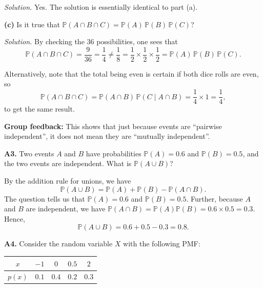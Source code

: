\documentclass[
  a4paper,
]{book}
\theoremstyle{definition}
\theoremstyle{definition}
\theoremstyle{definition}
\theoremstyle{definition}
\theoremstyle{remark}
\begin{document}
\begin{myanswers}
\emph{Solution.} Yes. The solution is essentially identical to part (a).

\end{myanswers}

\textbf{(c)} Is it true that \(\mathbb P(A \cap B \cap C) = \mathbb P(A) \, \mathbb P(B) \, \mathbb P(C)\)?

\begin{myanswers}
\emph{Solution.}
By checking the 36 possibilities, one sees that
\[ \mathbb P(A \cap B \cap C) = \frac{9}{36} = \frac{1}{4} \neq \frac{1}{8} = \frac12 \times \frac12 \times \frac12 = \mathbb P(A)\, \mathbb P(B) \, \mathbb P(C) . \]

Alternatively, note that the total being even is certain if both dice rolls are even, so
\[ \mathbb P(A \cap B \cap C) = \mathbb P(A \cap B) \, \mathbb P(C \mid A \cap B) = \frac14 \times 1 = \frac14 , \]
to get the same result.

\textbf{Group feedback:} This shows that just because events are ``pairwise independent'', it does not mean they are ``mutually independent''.

\end{myanswers}

\textbf{A3.} Two events \(A\) and \(B\) have probabilities \(\mathbb P(A) = 0.6\) and \(\mathbb P(B) = 0.5\), and the two events are independent. What is \(\mathbb P(A \cup B)\)?

\begin{myanswers}
By the addition rule for unions, we have
\[ \mathbb P(A \cup B) = \mathbb P(A) + \mathbb P(B) - \mathbb P(A \cap B) . \]
The question tells us that \(\mathbb P(A) = 0.6\) and \(\mathbb P(B) = 0.5\). Further, because \(A\) and \(B\) are independent, we have \(\mathbb P(A \cap B) = \mathbb P(A)\mathbb P(B) = 0.6 \times 0.5 = 0.3\). Hence,
\[ \mathbb P(A \cup B) = 0.6 + 0.5 - 0.3 = 0.8 . \]

\end{myanswers}

\textbf{A4.} Consider the random variable \(X\) with the following PMF:

\begin{longtable}[]{@{}ccccc@{}}
\toprule\noalign{}
\(x\) & \(-1\) & \(0\) & \(0.5\) & \(2\) \\
\midrule\noalign{}
\endhead
\bottomrule\noalign{}
\endlastfoot
\(p(x)\) & \(0.1\) & \(0.4\) & \(0.2\) & \(0.3\) \\
\end{longtable}
\end{document}
